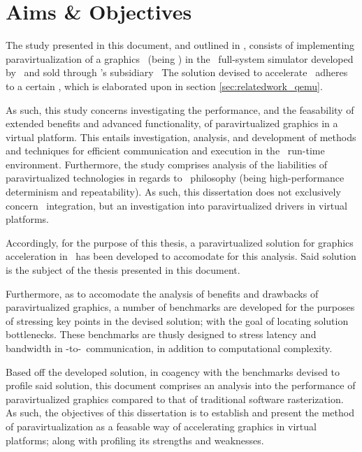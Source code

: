 
\chapter{Aims \& Objectives}
\label{cha:aimsandobjectives}
The study presented in this document, and outlined in , consists of implementing paravirtualization of a graphics \dvttermapi\ (being \dvttermopenglestwopointo ) in the \dvttermsimics\ full-system simulator developed by \dvttermintel\ and sold through \dvttermintel 's subsidiary \dvttermwindriver\ 
The solution devised to accelerate \dvttermopengl\ adheres to a certain \dvttermreferenceimplementation , which is elaborated upon in section \ref{sec:relatedwork_qemu}.

As such, this study concerns investigating the performance, and the feasability of extended benefits and advanced functionality, of paravirtualized graphics in a virtual platform.
This entails investigation, analysis, and development of methods and techniques for efficient communication and execution in the \dvttermsimics\ run-time environment.
Furthermore, the study comprises analysis of the liabilities of paravirtualized technologies in regards to \dvttermsimics\ philosophy (being high-performance determinism and repeatability).
As such, this dissertation does not exclusively concern \dvttermsimics\ integration, but an investigation into paravirtualized drivers in virtual platforms.

Accordingly, for the purpose of this thesis, a paravirtualized solution for graphics acceleration in \dvttermsimics\ has been developed to accomodate for this analysis.
Said solution is the subject of the thesis presented in this document.

Furthermore, as to accomodate the analysis of benefits and drawbacks of paravirtualized graphics, a number of benchmarks are developed for the purposes of stressing key points in the devised solution; with the goal of locating solution bottlenecks.
These benchmarks are thusly designed to stress latency and bandwidth in \dvttermtarget -to-\dvttermhost\ communication, in addition to computational complexity.

Based off the developed solution, in coagency with the benchmarks devised to profile said solution, this document comprises an analysis into the performance of paravirtualized graphics compared to that of traditional software rasterization.
As such, the objectives of this dissertation is to establish and present the method of paravirtualization as a feasable way of accelerating graphics in virtual platforms; along with profiling its strengths and weaknesses.
